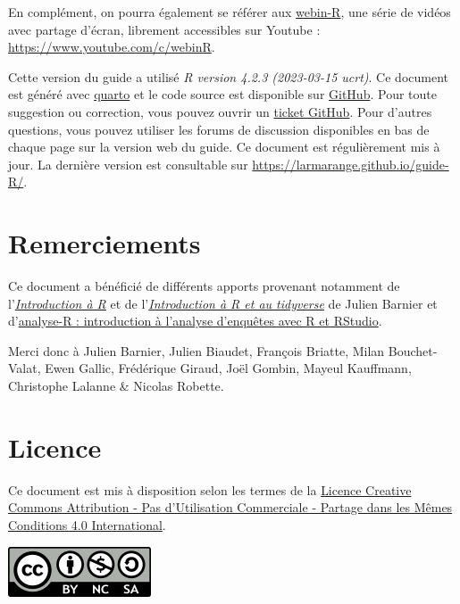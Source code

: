 \documentclass[
  letterpaper,
  DIV=11,
  numbers=noendperiod,
  oneside]{scrreprt}
\begin{document}
En complément, on pourra également se référer aux
\href{https://larmarange.github.io/webin-R/}{webin-R}, une série de
vidéos avec partage d'écran, librement accessibles sur Youtube :
\url{https://www.youtube.com/c/webinR}.

Cette version du guide a utilisé \emph{R version 4.2.3 (2023-03-15
ucrt)}. Ce document est généré avec \href{https://quarto.org/}{quarto}
et le code source est disponible sur
\href{https://github.com/larmarange/guide-R}{GitHub}. Pour toute
suggestion ou correction, vous pouvez ouvrir un
\href{https://github.com/larmarange/guide-R/issues}{ticket GitHub}. Pour
d'autres questions, vous pouvez utiliser les forums de discussion
disponibles en bas de chaque page sur la version web du guide. Ce
document est régulièrement mis à jour. La dernière version est
consultable sur \url{https://larmarange.github.io/guide-R/}.

\hypertarget{remerciements}{%
\section*{Remerciements}\label{remerciements}}


Ce document a bénéficié de différents apports provenant notamment de
l'\href{https://github.com/juba/intro-r}{\emph{Introduction à R}} et de
l'\href{https://juba.github.io/tidyverse/}{\emph{Introduction à R et au
tidyverse}} de Julien Barnier et
d'\href{https://larmarange.github.io/analyse-R/}{analyse-R :
introduction à l'analyse d'enquêtes avec R et RStudio}.

Merci donc à Julien Barnier, Julien Biaudet, François Briatte, Milan
Bouchet-Valat, Ewen Gallic, Frédérique Giraud, Joël Gombin, Mayeul
Kauffmann, Christophe Lalanne \& Nicolas Robette.

\hypertarget{licence}{%
\section*{Licence}\label{licence}}


Ce document est mis à disposition selon les termes de la
\href{http://creativecommons.org/licenses/by-nc-sa/4.0/}{Licence
Creative Commons Attribution - Pas d'Utilisation Commerciale - Partage
dans les Mêmes Conditions 4.0 International}.

\includegraphics[width=1.66667in,height=\textheight]{./ressources/by-nc-sa.png}
\end{document}
